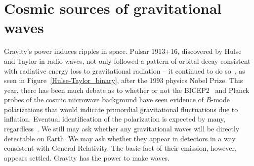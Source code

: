         
        \section{Cosmic sources of gravitational waves}
        \label{cosmic_sources}
      

		Gravity's power induces ripples in space. 
Pulsar 1913+16, discovered by Hulse and Taylor in radio waves, not only followed a pattern of orbital decay consistent with radiative energy loss to gravitational radiation -- it continued to do so~\cite{WeisbergTaylor2004,Weisberg2010}, as seen in Figure~\ref{Hulse-Taylor_binary}, after the 1993 physics Nobel Prize. 
This year, there has been much debate as to whether or not the BICEP2~\cite{BICEP2014} and Planck~\cite{Planck2014} probes of the cosmic microwave background have seen evidence of $B$-mode polarizations that would indicate primordial gravitational fluctuations due to inflation.
Eventual identification of the polarization is expected by many, regardless~\cite{Baumann2009}. 
We still may ask whether any gravitational waves will be directly detectable on Earth. 
We may ask whether they appear in detectors in a way consistent with General Relativity. 
The basic fact of their emission, however, appears settled.
Gravity has the power to make waves.

